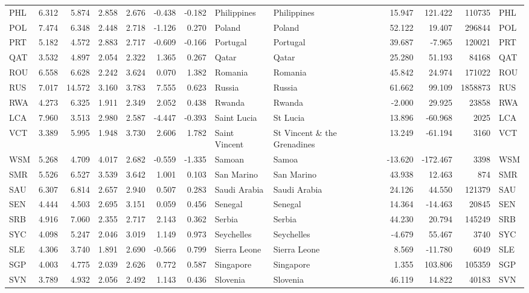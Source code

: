 \begin{tabular}{lrrrrrrllrrrl}
PHL & 6.312 & 5.874 & 2.858 & 2.676 & -0.438 & -0.182 & Philippines & Philippines & 15.947 & 121.422 & 110735 & PHL \\
POL & 7.474 & 6.348 & 2.448 & 2.718 & -1.126 & 0.270 & Poland & Poland & 52.122 & 19.407 & 296844 & POL \\
PRT & 5.182 & 4.572 & 2.883 & 2.717 & -0.609 & -0.166 & Portugal & Portugal & 39.687 & -7.965 & 120021 & PRT \\
QAT & 3.532 & 4.897 & 2.054 & 2.322 & 1.365 & 0.267 & Qatar & Qatar & 25.280 & 51.193 & 84168 & QAT \\
ROU & 6.558 & 6.628 & 2.242 & 3.624 & 0.070 & 1.382 & Romania & Romania & 45.842 & 24.974 & 171022 & ROU \\
RUS & 7.017 & 14.572 & 3.160 & 3.783 & 7.555 & 0.623 & Russia & Russia & 61.662 & 99.109 & 1858873 & RUS \\
RWA & 4.273 & 6.325 & 1.911 & 2.349 & 2.052 & 0.438 & Rwanda & Rwanda & -2.000 & 29.925 & 23858 & RWA \\
LCA & 7.960 & 3.513 & 2.980 & 2.587 & -4.447 & -0.393 & Saint Lucia & St Lucia & 13.896 & -60.968 & 2025 & LCA \\
VCT & 3.389 & 5.995 & 1.948 & 3.730 & 2.606 & 1.782 & Saint Vincent & St Vincent \& the Grenadines & 13.249 & -61.194 & 3160 & VCT \\
WSM & 5.268 & 4.709 & 4.017 & 2.682 & -0.559 & -1.335 & Samoan & Samoa & -13.620 & -172.467 & 3398 & WSM \\
SMR & 5.526 & 6.527 & 3.539 & 3.642 & 1.001 & 0.103 & San Marino & San Marino & 43.938 & 12.463 & 874 & SMR \\
SAU & 6.307 & 6.814 & 2.657 & 2.940 & 0.507 & 0.283 & Saudi Arabia & Saudi Arabia & 24.126 & 44.550 & 121379 & SAU \\
SEN & 4.444 & 4.503 & 2.695 & 3.151 & 0.059 & 0.456 & Senegal & Senegal & 14.364 & -14.463 & 20845 & SEN \\
SRB & 4.916 & 7.060 & 2.355 & 2.717 & 2.143 & 0.362 & Serbia & Serbia & 44.230 & 20.794 & 145249 & SRB \\
SYC & 4.098 & 5.247 & 2.046 & 3.019 & 1.149 & 0.973 & Seychelles & Seychelles & -4.679 & 55.467 & 3740 & SYC \\
SLE & 4.306 & 3.740 & 1.891 & 2.690 & -0.566 & 0.799 & Sierra Leone & Sierra Leone & 8.569 & -11.780 & 6049 & SLE \\
SGP & 4.003 & 4.775 & 2.039 & 2.626 & 0.772 & 0.587 & Singapore & Singapore & 1.355 & 103.806 & 105359 & SGP \\
SVN & 3.789 & 4.932 & 2.056 & 2.492 & 1.143 & 0.436 & Slovenia & Slovenia & 46.119 & 14.822 & 40183 & SVN \\

\end{tabular}
